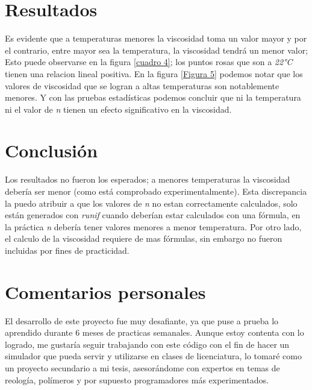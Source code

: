 \documentclass{elsarticle}
\begin{document}
\clearpage
\section{Resultados}
Es evidente que a temperaturas menores la viscosidad toma un valor mayor y por el contrario, entre mayor sea la temperatura, la viscosidad tendr\'a un menor valor; Esto puede observarse en la figura \ref{cuadro 4}; los puntos rosas que son a \textit{22°C} tienen una relacion lineal positiva.
En la figura \ref{Figura 5} podemos notar que los valores de viscosidad que se logran a altas temperaturas son notablemente menores.
Y con las pruebas estad\'isticas podemos concluir que ni la temperatura ni el valor de \textit{n} tienen un efecto significativo en la viscosidad.

\section{Conclusi\'on}
Los resultados no fueron los esperados; a menores temperaturas la viscosidad deber\'ia ser menor (como est\'a comprobado experimentalmente)\cite{R16}.
Esta discrepancia la puedo atribuir a que los valores de \textit{n} no estan correctamente calculados, solo est\'an generados con \textit{runif} cuando deber\'ian estar calculados con una f\'ormula, en la pr\'actica \textit{n} deber\'ia tener valores menores a menor temperatura.
Por otro lado, el calculo de la viscosidad requiere de mas f\'ormulas, sin embargo no fueron incluidas por fines de practicidad.

\section{Comentarios personales}
El desarrollo de este proyecto fue muy desafiante, ya que puse a prueba lo aprendido durante 6 meses de practicas semanales. Aunque estoy contenta con lo logrado, me gustar\'ia seguir trabajando con este c\'odigo con el fin de hacer un simulador que pueda servir y utilizarse en clases de licenciatura, lo tomar\'e como un proyecto secundario a mi tesis, asesor\'andome con expertos en temas de reolog\'ia, pol\'imeros y por supuesto programadores m\'as experimentados.



\end{document}
